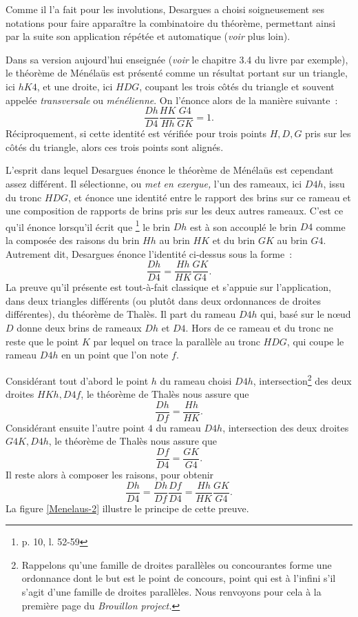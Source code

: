 \documentclass[12pt, a4paper]{article}
\begin{document}
Comme il l'a fait pour les involutions, Desargues a choisi soigneusement ses notations pour faire apparaître la combinatoire du théorème, permettant ainsi par la suite son application répétée et automatique (\textit{voir} plus loin). 

Dans sa version aujourd'hui enseignée (\textit{voir} le chapitre 3.4 du livre \cite{coxeter} par exemple), le théorème de Ménélaüs est présenté comme un résultat portant sur un triangle, ici $hK4$, et une droite, ici $HDG$, coupant les trois côtés du triangle et souvent appelée \textit{transversale} ou \textit{ménélienne}. On l'énonce alors de la manière suivante~:~
\[
\frac{Dh}{D4}\frac{HK}{Hh}\frac{G4}{GK}=1.
\]
Réciproquement, si cette identité est vérifiée pour trois points $H,D,G$ pris sur les côtés du triangle, alors ces trois points sont alignés.

L'esprit dans lequel Desargues énonce le théorème de Ménélaüs est cependant assez différent. Il sélectionne, ou \textit{met en exergue,} l'un des rameaux, ici $D4h$, issu du tronc $HDG$, et énonce une identité entre le rapport des brins sur ce rameau et une composition de rapports de brins pris sur les deux autres rameaux. C'est ce qu'il énonce lorsqu'il écrit que \footnote{p. 10, l. 52-59} le brin $Dh$ est à son accouplé le brin $D4$ comme la composée des raisons du brin $Hh$ au brin $HK$ et du brin $GK$ au brin $G4$. Autrement dit, Desargues énonce l'identité ci-dessus sous la forme~:~
\[
\frac{Dh}{D4}=\frac{Hh}{HK}\frac{GK}{G4}.
\]
La preuve qu'il présente est tout-à-fait classique et s'appuie sur l'application, dans deux triangles différents (ou plutôt dans deux ordonnances de droites différentes), du théorème de Thalès. Il part du rameau $D4h$ qui, basé sur le n{\oe}ud $D$ donne deux brins de rameaux $Dh$ et $D4$. Hors de ce rameau et du tronc ne reste que le point $K$ par lequel on trace la parallèle au tronc $HDG$, qui coupe le rameau $D4h$ en un point que l'on note $f$. 

Considérant tout d'abord le point $h$ du rameau choisi $D4h$, intersection\footnote{Rappelons qu'une famille de droites parallèles ou concourantes forme une ordonnance dont le but est le point de concours, point qui est à l'infini s'il s'agit d'une famille de droites parallèles. Nous renvoyons pour cela à la première page du \textit{Brouillon project.}} des deux droites $HKh, D4f$, le théorème de Thalès nous assure que
\[
\frac{Dh}{Df}=\frac{Hh}{HK}.
\]
Considérant ensuite l'autre point $4$ du rameau $D4h$, intersection des deux droites $G4K, D4h$, le théorème de Thalès nous assure que
\[
\frac{Df}{D4}=\frac{GK}{G4}.
\]
Il reste alors à composer les raisons, pour obtenir
\[
\frac{Dh}{D4}=\frac{Dh}{Df}\frac{Df}{D4}=\frac{Hh}{HK}\frac{GK}{G4}.
\]
La figure \ref{Menelaus-2} illustre le principe de cette preuve.
\end{document}
